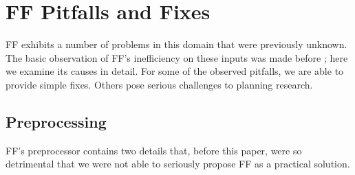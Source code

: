 \section{FF Pitfalls and Fixes}
\label{sec:crisp-ff}

FF exhibits a number of problems in this domain that were previously
unknown.  The basic observation of FF's inefficiency on these inputs
was made before
\cite{koller10:_exper_with_plann_for_natur_languag_gener}; here we
examine its causes in detail. For some of the observed pitfalls, we
are able to provide simple fixes. Others pose serious challenges to
planning research.


\subsection{Preprocessing}
\label{sec:crisp-ff:preprocess}















FF's preprocessor contains two details that, before this paper, were
so detrimental that we were not able to seriously propose FF as a
practical solution.



